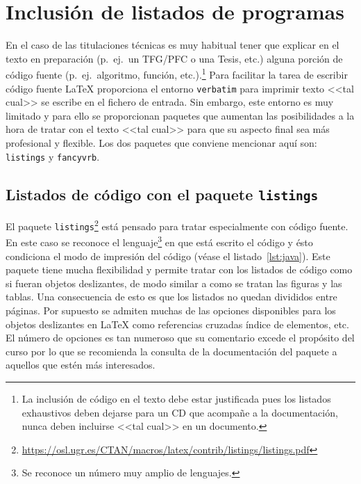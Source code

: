 \documentclass[ 		%
	11pt,				%
	a4paper,			%
	twoside,			%
	openright,			%
	final       		%
]{book}
\begin{document}
\begin{center}
\end{center}



\chapter{Inclusión de listados de programas}
En el caso de las titulaciones técnicas es muy habitual tener que explicar en el texto en preparación (p.~ej.\ un TFG/PFC o una Tesis, etc.) alguna porción de código fuente (p.~ej.\ algoritmo, función, etc.).\footnote{La inclusión de código en el texto debe estar justificada pues los listados exhaustivos deben dejarse para un CD que acompañe a la documentación, nunca deben incluirse <<tal cual>> en un documento.} Para facilitar la tarea de escribir código fuente \LaTeX{} proporciona el entorno \texttt{verbatim} para imprimir texto <<tal cual>> se escribe en el fichero de entrada. Sin embargo, este entorno es muy limitado y para ello se proporcionan paquetes que aumentan las posibilidades a la hora de tratar con el texto <<tal cual>> para que su aspecto final sea más profesional y flexible. Los dos paquetes que conviene mencionar aquí son: \texttt{listings} y \texttt{fancyvrb}.


\section{Listados de código con el paquete \texttt{listings}}
El paquete \texttt{listings}\footnote{\url{https://osl.ugr.es/CTAN/macros/latex/contrib/listings/listings.pdf}} está pensado para tratar especialmente con código fuente. En este caso se reconoce el lenguaje\footnote{Se reconoce un número muy amplio de lenguajes.} en que está escrito el código y ésto condiciona el modo de impresión del código (véase el listado~\ref{lst:java}). Este paquete tiene mucha flexibilidad y permite tratar con los listados de código como si fueran objetos deslizantes, de modo similar a como se tratan las figuras y las tablas. Una consecuencia de esto es que los listados no quedan divididos entre páginas. Por supuesto se admiten muchas de las opciones disponibles para los objetos deslizantes en \LaTeX{} como referencias cruzadas índice de elementos, etc. El número de opciones es tan numeroso que su comentario excede el propósito del curso por lo que se recomienda la consulta de la documentación del paquete a aquellos que estén más interesados.
\end{document}
